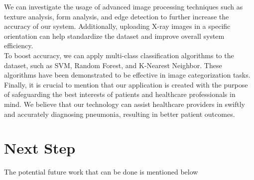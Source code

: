 We can investigate the usage of advanced image processing techniques such as texture analysis, form analysis, and edge detection to further increase the accuracy of our system. Additionally, uploading X-ray images in a specific orientation can help standardize the dataset and improve overall system efficiency.\\

To boost accuracy, we can apply multi-class classification algorithms to the dataset, such as SVM, Random Forest, and K-Nearest Neighbor. These algorithms have been demonstrated to be effective in image categorization tasks.\\

Finally, it is crucial to mention that our application is created with the purpose of safeguarding the best interests of patients and healthcare professionals in mind. We believe that our technology can assist healthcare providers in swiftly and accurately diagnosing pneumonia, resulting in better patient outcomes.\\

\section{Next Step}

The potential future work that can be done is mentioned below\\


